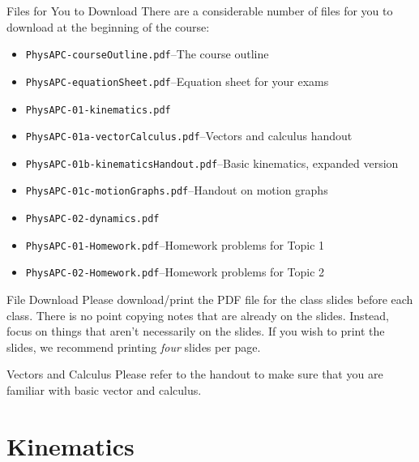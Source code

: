 \documentclass[12pt,compress,aspectratio=169]{beamer}
\begin{document}
\begin{frame}
  \titlepage
\end{frame}



\begin{frame}{Files for You to Download}
  There are a considerable number of files for you to download at the beginning
  of the course:
  \begin{itemize}
  \item\texttt{PhysAPC-courseOutline.pdf}--The course outline
  \item\texttt{PhysAPC-equationSheet.pdf}--Equation sheet for your exams
  \item\texttt{PhysAPC-01-kinematics.pdf}
  \item\texttt{PhysAPC-01a-vectorCalculus.pdf}--Vectors and calculus handout
  \item\texttt{PhysAPC-01b-kinematicsHandout.pdf}--Basic kinematics, expanded
    version
  \item\texttt{PhysAPC-01c-motionGraphs.pdf}--Handout on motion graphs
  \item\texttt{PhysAPC-02-dynamics.pdf}
  \item\texttt{PhysAPC-01-Homework.pdf}--Homework problems for Topic 1
  \item\texttt{PhysAPC-02-Homework.pdf}--Homework problems for Topic 2
  \end{itemize}
\end{frame}


\begin{frame}{File Download}
  Please download/print the PDF file for the class slides before
  each class. There is no point copying notes that are already on the slides.
  Instead, focus on things that aren't necessarily on the slides. If you wish
  to print the slides, we recommend printing \emph{four} slides per page.
\end{frame}



\begin{frame}{Vectors and Calculus}
  Please refer to the handout to make sure that you are familiar with
  basic vector and calculus.
\end{frame}



\section{Kinematics}
\end{document}
